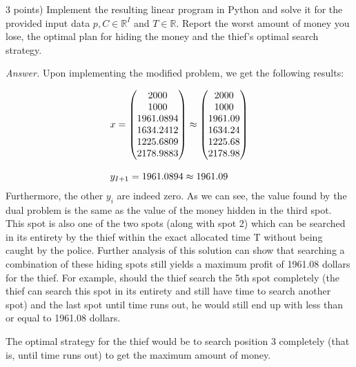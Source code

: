 \documentclass[10pt]{article}
\newenvironment{exercise}[2][Exercise]{\begin{trivlist}
  \item[\hskip \labelsep {\bfseries #1}\hskip \labelsep {\bfseries #2.}]}{\end{trivlist}}
\begin{document}
\begin{exercise}{5.5} (3 points) Implement the resulting linear program in Python and solve it for the provided input data $p, C \in \mathbb{R}^I$ and $T \in \mathbb{R}$. Report the worst amount of money you lose, the optimal plan for hiding the money and the thief's optimal search strategy. 

\textit{Answer.}
Upon implementing the modified problem, we get the following results:

\begin{equation}
\begin{array}{ll@{}lll}
x = \begin{pmatrix}
2000\\
1000\\
1961.0894\\
1634.2412\\
1225.6809\\
2178.9883\\
\end{pmatrix} 
\approx 
\begin{pmatrix}
2000\\
1000\\
1961.09\\
1634.24\\
1225.68\\
2178.98\\
\end{pmatrix}

\\ \\

y_{I+1} = 1961.0894 \approx 1961.09
\end{array}
\end{equation}
Furthermore, the other $y_i$ are indeed zero. As we can see, the value found by the dual problem is the same as the value of the money hidden in the third spot. This spot is also one of the two spots (along with spot 2) which can be searched in its entirety by the thief within the exact allocated time T without being caught by the police. Further analysis of this solution can show that searching a combination of these hiding spots still yields a maximum profit of 1961.08 dollars for the thief. For example, should the thief search the 5th spot completely (the thief can search this spot in its entirety and still have time to search another spot) and the last spot until time runs out, he would still end up with less than or equal to 1961.08 dollars.

The optimal strategy for the thief would be to search position 3 completely (that is, until time runs out) to get the maximum amount of money.




\end{exercise}
\end{document}
